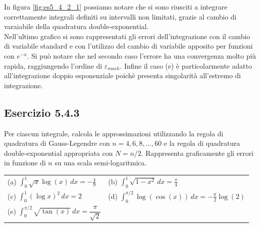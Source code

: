 \documentclass[letterpaper, 12pt]{article}
\numberwithin{equation}{section}    %
\begin{document}
In figura \ref{fig:es5_4_2_1} possiamo notare che si sono riusciti a integrare correttamente integrali
definiti su intervalli non limitati, grazie al cambio di varaiabile della quadratura double-exponential. \\
Nell'ultimo grafico si sono rappresentati gli errori dell'integrazione con il cambio di variabile standard e 
con l'utilizzo del cambio di variabile apposito per funzioni con $e^{-x}$. Si può notare che nel secondo caso 
l'errore ha una convergenza molto più rapida, raggiungendo l'ordine di $\varepsilon_{mach}$. Infine il caso
(e) è particolarmente adatto all'integrazione doppio esponenziale poichè presenta singolarità all'estremo di 
integrazione.

\subsection{Esercizio 5.4.3}
Per ciascun integrale, calcola le approssimazioni utilizzando la regola di quadratura di Gauss-Legendre 
con $n=4,6,8,\ldots,60$ e la regola di quadratura double-exponential appropriata con $N=n/2$. 
Rappresenta graficamente gli errori in funzione di $n$ su una scala semi-logaritmica.

\begin{tabular}{@{}ll@{}}
(a) $\displaystyle \int_0^1 \sqrt{x} \log(x) \, dx = -\frac{4}{9}$
    & (b) $\displaystyle \int_0^1 \sqrt{1-x^2}\, dx = \frac{\pi}{4}$ \\[1.5ex]
(c) $\displaystyle \int_0^1 (\log x)^2\, dx = 2$
    & (d) $\displaystyle \int_0^{\pi/2} \log(\cos(x))\, dx = -\frac{\pi}{2}\log(2)$ \\[1.5ex]
(e) $\displaystyle \int_0^{\pi/2} \sqrt{\tan(x)}\, dx = \dfrac{\pi}{\sqrt{2}}$ & \\
\end{tabular}
\end{document}
